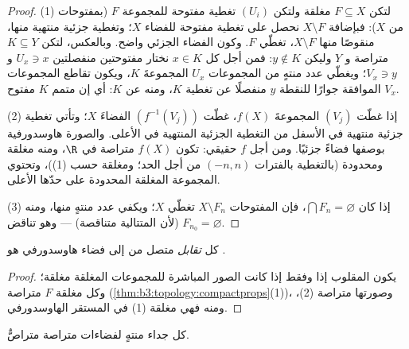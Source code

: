 \begin{proof}
(1) لتكن $F \subseteq X$ مغلقة ولتكن $(U_i)$ تغطية مفتوحة
للمجموعة $F$ (بمفتوحات من $X$): فبإضافة $X \setminus F$ نحصل على تغطية
مفتوحة للفضاء $X$؛ وتغطية جزئية منتهية منها، منقوصًا منها
$X \setminus F$، تغطّي $F$. وكون الفضاء الجزئي 
واضح. وبالعكس، لتكن $K \subseteq Y$ متراصة و $Y$ 
وليكن $y \notin K$: فمن أجل كل $x \in K$ نختار مفتوحتين
منفصلتين $U_x \ni x$ و $V_x \ni y$؛ ويغطّي عدد منتهٍ من
المجموعات $U_x$ المجموعةَ $K$، ويكون تقاطع المجموعات $V_x$
الموافقة جوارًا للنقطة $y$ منفصلًا عن تغطية $K$، ومنه عن $K$:
أي إن متمم $K$ مفتوح.

(2) إذا غطّت $(V_j)$ المجموعةَ $f(X)$، غطّت $(f^{-1}(V_j))$
الفضاءَ $X$؛ وتأتي تغطية جزئية منتهية في الأسفل من التغطية
الجزئية المنتهية في الأعلى. والصورة هاوسدورفية بوصفها فضاءً
جزئيًا. ومن أجل $f$ حقيقي: تكون $f(X)$ متراصة في $\R$، ومنه
مغلقة ومحدودة (بالتغطية بالفترات $(-n, n)$ من أجل الحد؛
ومغلقة حسب (1))، وتحتوي المجموعة المغلقة المحدودة على حدّها
الأعلى.

(3) إذا كان $\bigcap F_n = \varnothing$، فإن المفتوحات $X \setminus F_n$ تغطّي $X$؛ ويكفي عدد
منتهٍ منها، ومنه $F_{n_0} =
\varnothing$ (لأن المتتالية متناقصة) --- وهو تناقض.
\end{proof}

\begin{corollary}\label{cor:b3:topology:compacthomeo}
كل \emph{تقابل} متصل من  إلى فضاء هاوسدورفي هو .
\end{corollary}

\begin{proof}
يكون المقلوب  إذا وفقط إذا كانت الصور المباشرة للمجموعات
المغلقة مغلقة؛ وكل مغلقة $F$ متراصة (\cref{thm:b3:topology:compactprops}(1))، وصورتها
متراصة (2)، ومنه فهي مغلقة (1) في المستقر الهاوسدورفي.
\end{proof}

\begin{theorem}\label{thm:b3:topology:tychonoff}
كل جداء منتهٍ لفضاءات متراصة متراصٌّ.
\end{theorem}

